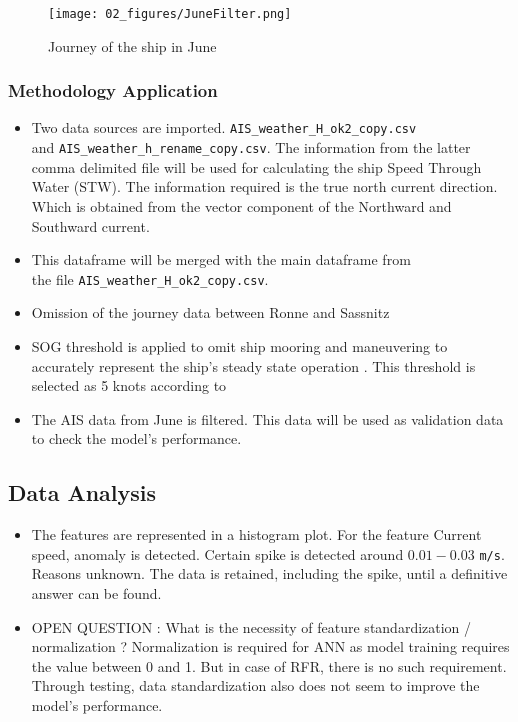 \begin{figure}
    \centering
        \texttt{[image: 02\_figures/JuneFilter.png]}
        \caption{Journey of the ship in June}
        \label{fig:JuneJourney}
\end{figure}

\subsubsection{Methodology Application}\label{methodology_application}



\begin{itemize}
    \item Two data sources are imported. {\tt AIS\_weather\_H\_ok2\_copy.csv} \\ and {\tt AIS\_weather\_h\_rename\_copy.csv}. The information from the latter comma delimited 
    file will be used for calculating the ship Speed Through Water (STW).  
    The information required is the true north current direction. Which is obtained from the vector component of the Northward and Southward current.
    \item This dataframe will be merged with the main dataframe from \\ the file {\tt AIS\_weather\_H\_ok2\_copy.csv}.
    \item Omission of the journey data between Ronne and Sassnitz
    \item SOG threshold is applied to omit ship mooring and maneuvering to accurately represent the ship's steady state operation 
    \cite{Abebe.2020,BalBesikci.2016,Gkerekos.2019,Yang.2020}. This threshold is selected as 5 knots according to \cite{Abebe.2020}
    \item The AIS data from June is filtered. This data will be used as validation data to check the model's performance.
\end{itemize}
 
\subsection{Data Analysis}
\begin{itemize}
    \item The features are represented in a histogram plot. For the feature Current speed, anomaly is detected. Certain spike is detected around $0.01 - 0.03$ \verb|m/s|. Reasons unknown. The data is retained, including the spike, until a definitive answer can be found.
    \item OPEN QUESTION : What is the necessity of feature standardization / normalization ? Normalization is required for ANN as model training requires the value between 0 and 1. But in case of RFR, there is no such requirement. Through testing, data standardization also does not seem to improve the model's performance. 
\end{itemize}

